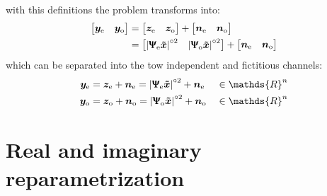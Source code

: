 with this definitions the problem transforms  into:
\begin{align}
	\begin{bmatrix}
		\bm y_\text{e}&\bm y_\text{o}
	\end{bmatrix} &=
	\begin{bmatrix}
		\bm z_\text{e}&\bm z_\text{o}
	\end{bmatrix} +
	\begin{bmatrix}
		\bm n_\text{e}&\bm n_\text{o}
	\end{bmatrix}
	\\&=	
	\begin{bmatrix}
		\left|\bm{ \Uppsi_\text{e} \tilde{x}}\right|^{\circ2}&\left|\bm{ \Uppsi_\text{o} \tilde{x}}\right|^{\circ2}
	\end{bmatrix} +
	\begin{bmatrix}
		\bm n_\text{e}&\bm n_\text{o}
	\end{bmatrix} \\
\end{align}
which can be separated into the tow independent and fictitious channels:
\begin{align}
	\bm y_\text{e} &= \bm z_\text{e} +\bm n_\text{e}= \left|\bm{ \Uppsi_\text{e} \tilde{x}}\right|^{\circ2}+\bm n_\text{e}&&\in\mathds{R}^n\\
	\bm y_\text{o} &= \bm z_\text{o} +\bm n_\text{o}= \left|\bm{ \Uppsi_\text{o} \tilde{x}}\right|^{\circ2}+\bm n_\text{o}&&\in\mathds{R}^n
\end{align}


\section{Real and imaginary reparametrization}

